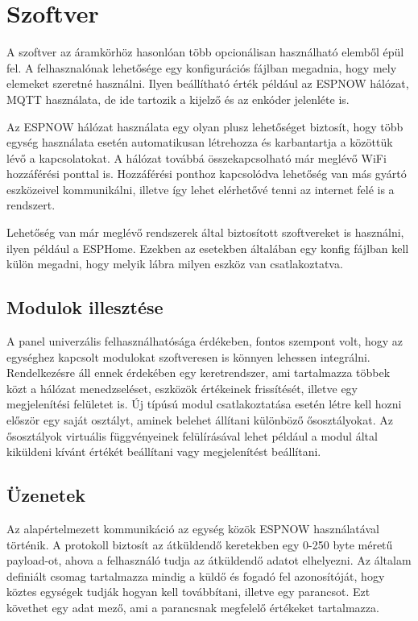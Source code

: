 \section{Szoftver}

A szoftver az áramkörhöz hasonlóan több opcionálisan használható elemből épül fel. A felhasznalónak lehetősége egy konfigurációs fájlban megadnia, hogy mely elemeket szeretné használni. Ilyen beállítható érték például az ESPNOW hálózat, MQTT használata, de ide tartozik a kijelző és az enkóder jelenléte is. 

Az ESPNOW hálózat használata egy olyan plusz lehetőséget biztosít, hogy több egység használata esetén automatikusan létrehozza és karbantartja a közöttük lévő a kapcsolatokat. A hálózat továbbá összekapcsolható már meglévő WiFi hozzáférési ponttal is. Hozzáférési ponthoz kapcsolódva lehetőség van más gyártó eszközeivel kommunikálni, illetve így lehet elérhetővé tenni az internet felé is a rendszert.

Lehetőség van már meglévő rendszerek által biztosított szoftvereket is használni, ilyen például a ESPHome. Ezekben az esetekben általában egy konfig fájlban kell külön megadni, hogy melyik lábra milyen eszköz van csatlakoztatva.


\subsection{Modulok illesztése}
A panel univerzális felhasználhatósága érdékeben, fontos szempont volt, hogy az egységhez kapcsolt modulokat szoftveresen is könnyen lehessen integrálni. Rendelkezésre áll ennek érdekében egy keretrendszer, ami tartalmazza többek közt a hálózat menedzseléset, eszközök értékeinek frissítését, illetve egy megjelenítési felületet is.
Új típúsú modul csatlakoztatása esetén létre kell hozni először egy saját osztályt, aminek belehet állítani különböző ősosztályokat. Az ősosztályok virtuális függvényeinek felülírásával lehet például a modul által kiküldeni kívánt értékét beállítani vagy megjelenítést beállítani.

\subsection{Üzenetek}
Az alapértelmezett kommunikáció az egység közök ESPNOW használatával történik. A protokoll biztosít az átküldendő keretekben egy 0-250 byte méretű payload-ot, ahova a felhasználó tudja az átküldendő adatot elhelyezni. Az általam definiált csomag tartalmazza mindig a küldő és fogadó fel azonosítóját, hogy köztes egységek tudják hogyan kell továbbítani, illetve egy parancsot. Ezt követhet egy adat mező, ami a parancsnak megfelelő értékeket tartalmazza.

